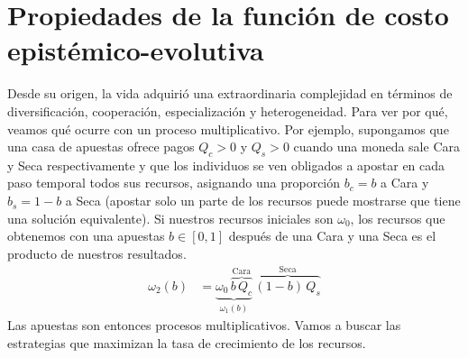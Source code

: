 \documentclass[a4paper,11pt]{book}
\theoremstyle{definition}
\begin{document}

\section{Propiedades de la función de costo epistémico-evolutiva} \label{sec:propiedades_funcion_costo}
Desde su origen, la vida adquirió una extraordinaria complejidad en términos de diversificación, cooperación, especialización y heterogeneidad.
%
Para ver por qué, veamos qué ocurre con un proceso multiplicativo.
%
Por ejemplo, supongamos que una casa de apuestas ofrece pagos $Q_c > 0$ y $Q_s > 0$ cuando una moneda sale Cara y Seca respectivamente y que los individuos se ven obligados a apostar en cada paso temporal todos sus recursos, asignando una proporción $b_c = b$ a Cara y $b_s = 1 - b$ a Seca (apostar solo un parte de los recursos puede mostrarse que tiene una solución equivalente).
%
Si nuestros recursos iniciales son $\omega_0$, los recursos que obtenemos con una apuestas $b \in [0,1]$ después de una Cara y una Seca es el producto de nuestros resultados.
%
 \begin{equation*}
\begin{split}
\omega_2(b) & = \underbrace{\omega_0 \, \overbrace{b \,  Q_c}^{\text{Cara}}}_{\omega_1(b)} \, \overbrace{(1-b) \, Q_s}^{\text{Seca}}
\end{split}
\end{equation*}
%
Las apuestas son entonces procesos multiplicativos.
%
Vamos a buscar las estrategias que maximizan la tasa de crecimiento de los recursos.
\end{document}
